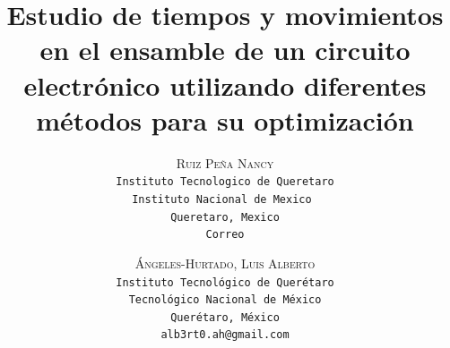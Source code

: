   \lfoot{ \thepage}
  
  \setlength{\droptitle}{-5\baselineskip} %
  \title{\textbf{Estudio de tiempos y movimientos en el ensamble de un circuito electrónico utilizando diferentes métodos para su optimización }} %
  
   \author{ 
   \textsc{Ruiz Peña Nancy}\\ 
   \texttt{ Instituto Tecnologico de Queretaro  } \\ 
   \texttt{Instituto Nacional de Mexico } \\ 
   \texttt{Queretaro, Mexico}\\ 
   \texttt{Correo} 
   \and 
   \textsc{Ángeles-Hurtado, Luis Alberto}\\ 
   \texttt{ Instituto Tecnológico de Querétaro } \\ 
   \texttt{ Tecnológico Nacional de México } \\ 
   \texttt{Querétaro, México}\\ 
   \texttt{alb3rt0.ah@gmail.com} 
  }
  
  
  
  
  \maketitle
  \thispagestyle{fancy}
  
